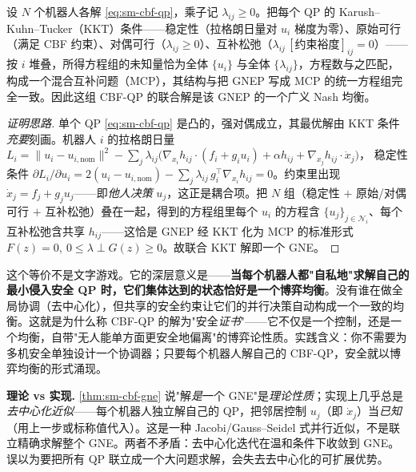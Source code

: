 \begin{theorem}\label{thm:sm-cbf-gne}
设 $N$ 个机器人各解 \cref{eq:sm-cbf-qp}，乘子记 $\lambda_{ij}\ge0$。把每个 QP 的 Karush--Kuhn--Tucker（KKT）条件——稳定性（拉格朗日量对 $u_i$ 梯度为零）、原始可行（满足 CBF 约束）、对偶可行（$\lambda_{ij}\ge0$）、互补松弛（$\lambda_{ij}\,[\text{约束裕度}]_{ij}=0$）——按 $i$ 堆叠，所得方程组的未知量恰为全体 $\{u_i\}$ 与全体 $\{\lambda_{ij}\}$，方程数与之匹配，构成一个混合互补问题（MCP），其结构与把 GNEP 写成 MCP 的统一方程组完全一致。因此这组 CBF-QP 的联合解是该 GNEP 的一个广义 Nash 均衡。
\end{theorem}
\begin{proof}[证明思路]
单个 QP \cref{eq:sm-cbf-qp} 是凸的，强对偶成立，其最优解由 KKT 条件\emph{充要}刻画。机器人 $i$ 的拉格朗日量
$L_i=\|u_i-u_{i,\text{nom}}\|^2-\sum_{j}\lambda_{ij}\big(\nabla_{x_i}h_{ij}\cdot(f_i+g_iu_i)+\alpha h_{ij}+\nabla_{x_j}h_{ij}\cdot\dot x_j\big)$，
稳定性条件 $\partial L_i/\partial u_i=2(u_i-u_{i,\text{nom}})-\sum_j\lambda_{ij}\,g_i^\top\nabla_{x_i}h_{ij}=0$。约束里出现 $\dot x_j=f_j+g_ju_j$——即\emph{他人决策} $u_j$，这正是耦合项。把 $N$ 组（稳定性 $+$ 原始/对偶可行 $+$ 互补松弛）叠在一起，得到的方程组里每个 $u_i$ 的方程含 $\{u_j\}_{j\in\mathcal{N}_i}$、每个互补松弛含共享 $h_{ij}$——这恰是 GNEP 经 KKT 化为 MCP 的标准形式 $F(z)=0,\ 0\le\lambda\perp G(z)\ge0$。故联合 KKT 解即一个 GNE。
\end{proof}

这个等价不是文字游戏。它的深层意义是——\textbf{当每个机器人都"自私地"求解自己的最小侵入安全 QP 时，它们集体达到的状态恰好是一个博弈均衡}。没有谁在做全局协调（去中心化），但共享的安全约束让它们的并行决策自动构成一个一致的均衡。这就是为什么称 CBF-QP 的解为"安全\emph{证书}"——它不仅是一个控制，还是一个均衡，自带"无人能单方面更安全地偏离"的博弈论性质。实践含义：你不需要为多机安全单独设计一个协调器；只要每个机器人解自己的 CBF-QP，安全就以博弈均衡的形式涌现。

\begin{note}
\textbf{理论 vs 实现.}\;
\cref{thm:sm-cbf-gne} 说"解\emph{是}一个 GNE"是\emph{理论性质}；实现上几乎总是\emph{去中心化近似}——每个机器人独立解自己的 QP，把邻居控制 $u_j$（即 $\dot x_j$）当\emph{已知}（用上一步或标称值代入）。这是一种 Jacobi/Gauss--Seidel 式并行近似，不是联立精确求解整个 GNE。两者不矛盾：去中心化迭代在温和条件下收敛到 GNE。误以为要把所有 QP 联立成一个大问题求解，会失去去中心化的可扩展优势。
\end{note}

